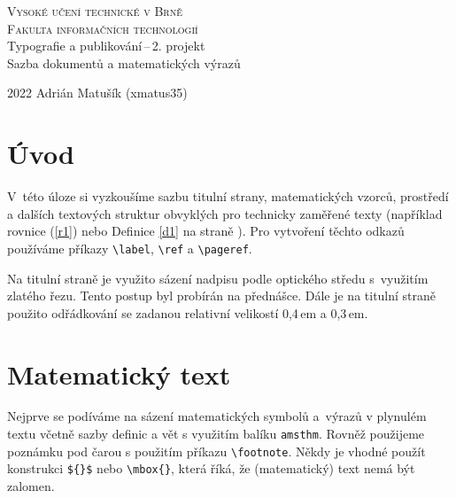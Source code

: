 \documentclass[a4paper, 11pt, twocolumn]{article}
\theoremstyle{definition}
\theoremstyle{plain}
\begin{document}
    \begin{titlepage}
        \begin{center}
            {\Huge \textsc{Vysoké učení technické v Brně}} \\ \bigskip
            {\huge \textsc{Fakulta informačních technologií}} \\ 
            {\LARGE Typografie a publikování\,--\,2. projekt \\ Sazba dokumentů a matematických výrazů}
        \end{center}
        {\Large 2022 \hfill Adrián Matušík (xmatus35)}
    \end{titlepage}
\section*{Úvod}
V~této úloze si vyzkoušíme sazbu titulní strany, matematic\-kých vzorců, prostředí a dalších textových struktur obvyklých pro technicky zaměřené texty (například rovnice (\ref{r1}) nebo Definice \ref{d1} na straně \pageref{d1}). Pro vytvoření těchto odkazů používáme příkazy \verb|\label|, \verb|\ref| a \verb|\pageref|.

Na titulní straně je využito sázení nadpisu podle optického středu s~využitím zlatého řezu. Tento postup byl probírán na přednášce. Dále je na titulní straně použito odřádkování se zadanou relativní velikostí 0,4\,em a 0,3\,em.

\section{Matematický text}
Nejprve se podíváme na sázení matematických symbolů a~výrazů v plynulém textu včetně sazby definic a vět s využitím balíku \verb|amsthm|. Rovněž použijeme poznámku pod čarou s použitím příkazu \verb|\footnote|. Někdy je vhodné použít konstrukci \verb|${}$| nebo \verb|\mbox{}|, která říká, že (matematický) text nemá být zalomen.
\end{document}
